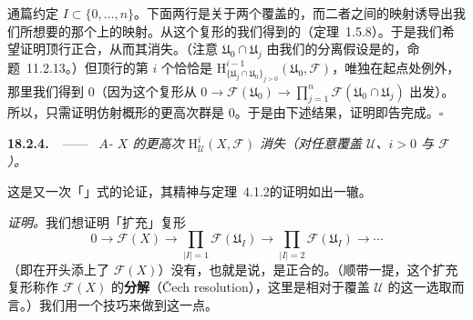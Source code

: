 通篇约定 $I\subset\{0,\dots,n\}$。下面两行是关于两个覆盖的\trCech\trComplexN，而二者之间的映射诱导出我们所想要的那个\trCohomology{}上的映射。从这个复形的\trShortExactSequence{}我们得到\trCohomology{}的\trLongExactSequence（\mbox{定理~1.5.8}）。于是我们希望证明顶行正合，从而其\trCohomology{}消失。（注意 $\mathfrak{U}_0\cap\mathfrak{U}_j$ 由我们的分离假设是\trAffine{}的，\mbox{命题~11.2.13}。）但顶行的第 $i$ 个\trCohomology{}恰恰是 $\mathrm{H}^{i-1}_{\{\mathfrak{U}_j\cap\mathfrak{U}_0\}_{j>0}}(\mathfrak{U}_0,\mathscr{F})$，唯独在起点处例外，那里我们得到 $0$（因为这个复形从 $0\to\mathscr{F}(\mathfrak{U}_0)\to\prod_{j=1}^{n}\mathscr{F}(\mathfrak{U}_0\cap\mathfrak{U}_j)$ 出发）。所以，只需证明仿射概形的更高次\trCech{}群是 $0$。于是由下述结果，证明即告完成。\hfill$\square$

\textbf{18.2.4.\ }\ ——\ \emph{\trAffine{} $A$-\trScheme{} $X$ 的更高次\trCechCohomology{} $\mathrm{H}^i_{\mathscr{U}}(X,\mathscr{F})$ 消失（对任意\trAffine{}覆盖 $\mathscr{U}$、$i>0$ 与\trQCSheaf{} $\mathscr{F}$）。}

这是又一次「\trPartitionOfUnity」式的论证，其精神与\mbox{定理~4.1.2}的证明如出一辙。

\emph{证明。}\quad 我们想证明「扩充」复形
\begin{equation*}\tag{18.2.4.1}\label{eq:extended-cech-complex}
0\longrightarrow\mathscr{F}(X)\longrightarrow\prod_{|I|=1}\mathscr{F}(\mathfrak{U}_I)\longrightarrow\prod_{|I|=2}\mathscr{F}(\mathfrak{U}_I)\longrightarrow\cdots
\end{equation*}
（即在开头添上了\trGlobalSections{} $\mathscr{F}(X)$）没有\trCohomology，也就是说，是正合的。（顺带一提，这个扩充复形称作 $\mathscr{F}(X)$ 的\textbf{\trCech{}分解}（Čech resolution），这里是相对于覆盖 $\mathscr{U}$ 的这一选取而言。）我们用一个技巧来做到这一点。

